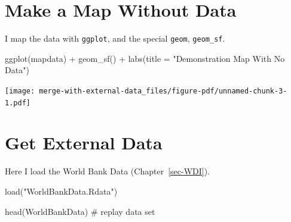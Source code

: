 \documentclass[
  letterpaper,
  DIV=11,
  numbers=noendperiod,
  oneside]{scrreprt}
\newenvironment{Shaded}{\begin{snugshade}}{\end{snugshade}}
\newcommand{\AttributeTok}[1]{\textcolor[rgb]{0.40,0.45,0.13}{#1}}
\newcommand{\CommentTok}[1]{\textcolor[rgb]{0.37,0.37,0.37}{#1}}
\newcommand{\FunctionTok}[1]{\textcolor[rgb]{0.28,0.35,0.67}{#1}}
\newcommand{\NormalTok}[1]{\textcolor[rgb]{0.00,0.23,0.31}{#1}}
\newcommand{\SpecialCharTok}[1]{\textcolor[rgb]{0.37,0.37,0.37}{#1}}
\newcommand{\StringTok}[1]{\textcolor[rgb]{0.13,0.47,0.30}{#1}}
\begin{document}
\section{Make a Map Without Data}\label{make-a-map-without-data}

I map the data with \texttt{ggplot}, and the special \texttt{geom},
\texttt{geom\_sf}.

\begin{Shaded}
\begin{Highlighting}[]
\FunctionTok{ggplot}\NormalTok{(mapdata) }\SpecialCharTok{+} 
  \FunctionTok{geom\_sf}\NormalTok{() }\SpecialCharTok{+}
  \FunctionTok{labs}\NormalTok{(}\AttributeTok{title =} \StringTok{"Demonstration Map With No Data"}\NormalTok{)}
\end{Highlighting}
\end{Shaded}

\texttt{[image: merge-with-external-data\_files/figure-pdf/unnamed-chunk-3-1.pdf]}

\section{Get External Data}\label{get-external-data}

Here I load the World Bank Data (Chapter~\ref{sec-WDI}).

\begin{Shaded}
\begin{Highlighting}[]
\FunctionTok{load}\NormalTok{(}\StringTok{"WorldBankData.Rdata"}\NormalTok{)}

\FunctionTok{head}\NormalTok{(WorldBankData) }\CommentTok{\# replay data set}
\end{Highlighting}
\end{Shaded}
\end{document}
